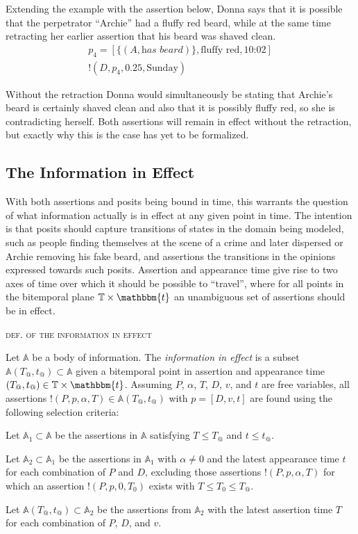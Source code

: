 \documentclass[sfsidenotes,nobib,twoside,symmetric]{tufte-handout}
\newcommand{\assert}{\text{!}}
\newcounter{majorcount}
\newcommand{\deffy}[3]{
	\vspace{2ex}
	\refstepcounter{majorcount} 
	\noindent\textsc{#1}%
	\\\begin{small}
	\noindent #2%
	\label{Def:#3}
	\end{small}
	\vspace{2ex}
}
\begin{document}
Extending the example with the assertion below, Donna says that it is possible that the perpetrator \enquote{Archie} had a fluffy red beard, while at the same time retracting her earlier assertion that his beard was shaved clean. 
\begin{align*}
p_{4} = [\{(A, \textit{has beard})\}, \textrm{fluffy red}, \textrm{10:02}] \\
\assert(D, p_{4}, 0.25, \textrm{Sunday}) 
\end{align*}

Without the retraction Donna would simultaneously be stating that Archie's beard is certainly shaved clean and also that it is possibly fluffy red, so she is contradicting herself. Both assertions will remain in effect without the retraction, but exactly why this is the case has yet to be formalized. 

\subsection{The Information in Effect}
%
With both assertions and posits being bound in time, this warrants the question of what information actually is in effect at any given point in time. The intention is that posits should capture transitions of states in the domain being modeled, such as people finding themselves at the scene of a crime and later dispersed or Archie removing his fake beard, and assertions the transitions in the opinions expressed towards such posits. Assertion and appearance time give rise to two axes of time over which it should be possible to \enquote{travel}, where for all points in the bitemporal plane $\mathbb{T} \times \mathbbm{t}$ an unambiguous set of assertions should be in effect.

\deffy{def. of the information in effect}{%
Let $\mathbb{A}$ be a body of information. The \emph{information in effect} is a subset $\mathbb{A}(T_@, t_@) \subset \mathbb{A}$ given a bitemporal point in assertion and appearance time $(T_@, t_@) \in \mathbb{T} \times \mathbbm{t}$. Assuming $P$, $\alpha$, $T$, $D$, $v$, and $t$ are free variables, all assertions $\assert(P, p, \alpha, T) \in \mathbb{A}(T_@, t_@)$ with $p = [D, v, t]$ are found using the following selection criteria: 
\begin{criteria}
\item Let $\mathbb{A}_1 \subset \mathbb{A}$ be the assertions in $\mathbb{A}$ satisfying $T \leq T_@$ and $t \leq t_@$.
\item Let $\mathbb{A}_2 \subset \mathbb{A}_1$ be the assertions in $\mathbb{A}_1$ with $\alpha \neq 0$ and the latest appearance time $t$ for each combination of $P$ and $D$, excluding those assertions $\assert(P, p, \alpha, T)$ for which an assertion $\assert(P, p, 0, T_0)$ exists with $T \leq T_0 \leq T_@$.
\item Let $\mathbb{A}(T_@, t_@) \subset \mathbb{A}_2$ be the assertions from $\mathbb{A}_2$ with the latest assertion time $T$ for each combination of $P$, $D$, and $v$.
\end{criteria}
}{effect}
\end{document}
